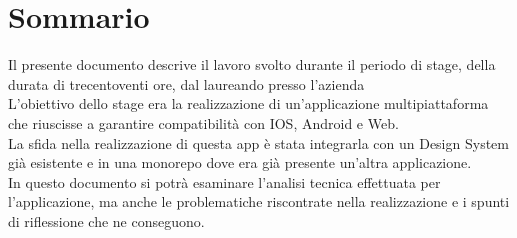 \cleardoublepage
{}
{}
\begingroup
\let\clearpage\relax
\let\cleardoublepage\relax
\chapter*{Sommario}

Il presente documento descrive il lavoro svolto durante il periodo di stage, della durata di trecentoventi ore, dal laureando \myName presso l'azienda \myAzienda
\\L'obiettivo dello stage era la realizzazione di un'applicazione multipiattaforma che riuscisse a garantire compatibilità con IOS, Android e Web.
\\La sfida nella realizzazione di questa app è stata integrarla con un Design System già esistente e in una monorepo dove era già presente un'altra applicazione.
\\In questo documento si potrà esaminare l'analisi tecnica effettuata per l'applicazione, ma anche le problematiche riscontrate nella realizzazione e i spunti di riflessione che ne conseguono.

\endgroup
\vfill
